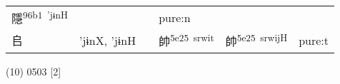\documentclass[14pt,a4paper]{scrartcl}
\begin{document}
\begin{longtable}[c]{@{}llllll@{}}
\begin{minipage}[t]{0.14\columnwidth}
隱\textsuperscript{96b1~'jɨnH}
\strut\end{minipage} &
\begin{minipage}[t]{0.14\columnwidth}\raggedright\strut
\strut\end{minipage} &
\begin{minipage}[t]{0.14\columnwidth}\raggedright\strut
\strut\end{minipage} &
\begin{minipage}[t]{0.14\columnwidth}\raggedright\strut
pure:n
\strut\end{minipage}\tabularnewline
\begin{minipage}[t]{0.14\columnwidth}\raggedright\strut
𠂤
\strut\end{minipage} &
\begin{minipage}[t]{0.14\columnwidth}\raggedright\strut
'jɨnX, 'jɨnH
\strut\end{minipage} &
\begin{minipage}[t]{0.14\columnwidth}\raggedright\strut
\strut\end{minipage} &
\begin{minipage}[t]{0.14\columnwidth}\raggedright\strut
帥\textsuperscript{5e25~srwit}
\strut\end{minipage} &
\begin{minipage}[t]{0.14\columnwidth}\raggedright\strut
帥\textsuperscript{5e25~srwijH}
\strut\end{minipage} &
\begin{minipage}[t]{0.14\columnwidth}\raggedright\strut
pure:t
\strut\end{minipage}\tabularnewline
\bottomrule
\end{longtable}

(10) 0503 {[}2{]}
\end{document}
